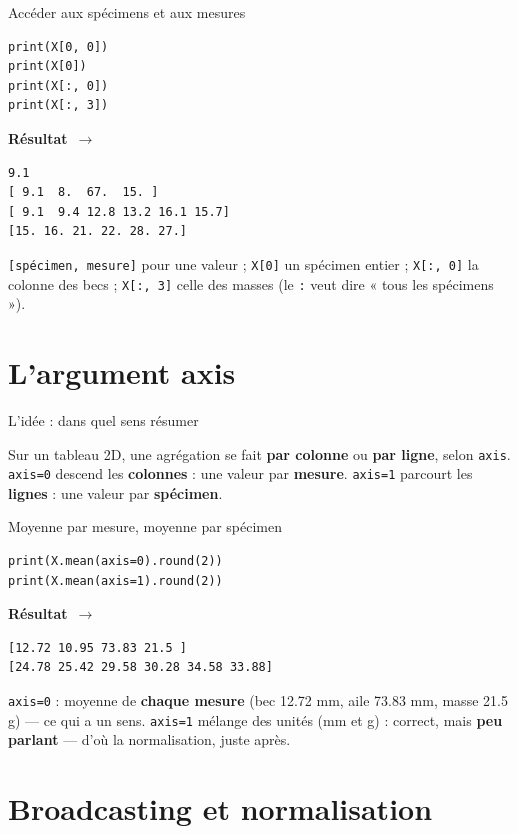 \documentclass[aspectratio=169,11pt]{beamer}
\newcommand{\resultat}{{\scriptsize\textbf{R\'esultat}~$\rightarrow$}\par\vspace{1pt}}
\begin{document}
\begin{frame}[fragile]{Accéder aux spécimens et aux mesures}
\begin{lstlisting}
print(X[0, 0])
print(X[0])
print(X[:, 0])
print(X[:, 3])
\end{lstlisting}
\resultat
\begin{lstlisting}[style=out]
9.1
[ 9.1  8.  67.  15. ]
[ 9.1  9.4 12.8 13.2 16.1 15.7]
[15. 16. 21. 22. 28. 27.]
\end{lstlisting}
{\small \texttt{[spécimen, mesure]} pour une valeur ; \texttt{X[0]} un spécimen entier ; \texttt{X[:, 0]} la colonne des becs ; \texttt{X[:, 3]} celle des masses (le \texttt{:} veut dire « tous les spécimens »).}
\end{frame}

\section{L'argument axis}

\begin{frame}{L'idée : dans quel sens résumer}
\begin{ucaddef}
{\small Sur un tableau 2D, une agrégation se fait \textbf{par colonne} ou \textbf{par ligne}, selon \texttt{axis}. \texttt{axis=0} descend les \textbf{colonnes} : une valeur par \textbf{mesure}. \texttt{axis=1} parcourt les \textbf{lignes} : une valeur par \textbf{spécimen}.}
\end{ucaddef}
\end{frame}

\begin{frame}[fragile]{Moyenne par mesure, moyenne par spécimen}
\begin{lstlisting}
print(X.mean(axis=0).round(2))
print(X.mean(axis=1).round(2))
\end{lstlisting}
\resultat
\begin{lstlisting}[style=out]
[12.72 10.95 73.83 21.5 ]
[24.78 25.42 29.58 30.28 34.58 33.88]
\end{lstlisting}
{\small \texttt{axis=0} : moyenne de \textbf{chaque mesure} (bec 12.72 mm, aile 73.83 mm, masse 21.5 g) — ce qui a un sens. \texttt{axis=1} mélange des unités (mm et g) : correct, mais \textbf{peu parlant} — d'où la normalisation, juste après.}
\end{frame}

\section{Broadcasting et normalisation}
\end{document}
